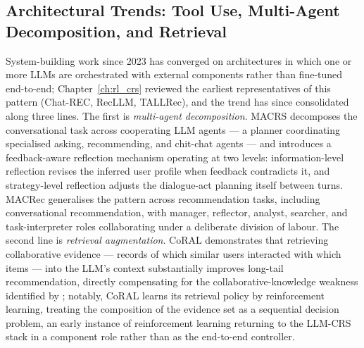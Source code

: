 \subsection{Architectural Trends: Tool Use, Multi-Agent Decomposition, and Retrieval}

System-building work since 2023 has converged on architectures in which one or more LLMs are orchestrated with external components rather than fine-tuned end-to-end; Chapter~\ref{ch:rl_crs} reviewed the earliest representatives of this pattern (Chat-REC, RecLLM, TALLRec), and the trend has since consolidated along three lines. The first is \textit{multi-agent decomposition}. MACRS \citep{fang2024multi} decomposes the conversational task across cooperating LLM agents — a planner coordinating specialised asking, recommending, and chit-chat agents — and introduces a feedback-aware reflection mechanism operating at two levels: information-level reflection revises the inferred user profile when feedback contradicts it, and strategy-level reflection adjusts the dialogue-act planning itself between turns. MACRec \citep{wang2024macrec} generalises the pattern across recommendation tasks, including conversational recommendation, with manager, reflector, analyst, searcher, and task-interpreter roles collaborating under a deliberate division of labour. The second line is \textit{retrieval augmentation}. CoRAL \citep{wu2024coral} demonstrates that retrieving collaborative evidence — records of which similar users interacted with which items — into the LLM's context substantially improves long-tail recommendation, directly compensating for the collaborative-knowledge weakness identified by \citet{he2023large}; notably, CoRAL learns its retrieval policy by reinforcement learning, treating the composition of the evidence set as a sequential decision problem, an early instance of reinforcement learning returning to the LLM-CRS stack in a component role rather than as the end-to-end controller.

